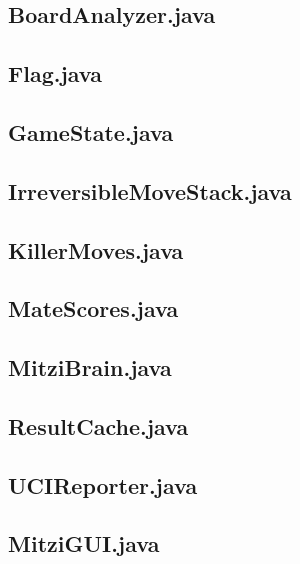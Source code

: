 \documentclass [12pt ,a4paper, english]{scrartcl}
\theoremstyle{plain}
\theoremstyle{definition}
\theoremstyle{remark}
\begin{document}
\subsection{BoardAnalyzer.java}


\subsection{Flag.java}


\subsection{GameState.java}


\subsection{IrreversibleMoveStack.java}


\subsection{KillerMoves.java}


\subsection{MateScores.java}


\subsection{MitziBrain.java}


\subsection{ResultCache.java}


\subsection{UCIReporter.java}


\subsection{MitziGUI.java}

\end{document}
